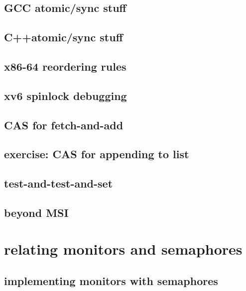 \subsection{GCC atomic/sync stuff}


\subsection{C++atomic/sync stuff}


\subsection{x86-64 reordering rules}


\subsection{xv6 spinlock debugging}



\subsection{CAS for fetch-and-add}


\subsection{exercise: CAS for appending to list}



\subsection{test-and-test-and-set}




\subsection{beyond MSI}


\section{relating monitors and semaphores}

\subsection{implementing monitors with semaphores}

